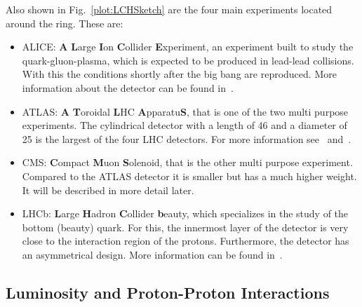 Also shown in Fig.~\ref{plot:LCHSketch} are the four main experiments located around the ring. These are:
\begin{itemize}
\item{ALICE}: \textbf{A} \textbf{L}arge \textbf{I}on \textbf{C}ollider \textbf{E}xperiment, an experiment built to study the quark-gluon-plasma, which is expected to be produced in lead-lead collisions. With this the conditions shortly after the big bang are reproduced. More information about the detector can be found in~.
\item{ATLAS}: \textbf{A} \textbf{T}oroidal \textbf{L}HC \textbf{A}pparatu\textbf{S}, that is one of the two multi purpose experiments. The cylindrical detector with a length of 46\m{} and a diameter of 25\m{} is the largest of the four LHC detectors. For more information see~ and~.
\item{CMS}: \textbf{C}ompact \textbf{M}uon \textbf{S}olenoid, that is the other multi purpose experiment. Compared to the ATLAS detector it is smaller but has a much higher weight. It will be described in more detail later.
\item{LHCb}: \textbf{L}arge \textbf{H}adron \textbf{C}ollider \textbf{b}eauty, which specializes in the study of the bottom (beauty) quark. For this, the innermost layer of the detector is very close to the interaction region of the protons. Furthermore, the detector has an asymmetrical design. More information can be found in~.
\end{itemize}


\subsection{Luminosity and Proton-Proton Interactions \label{sec:IntroLumiPPI}}

